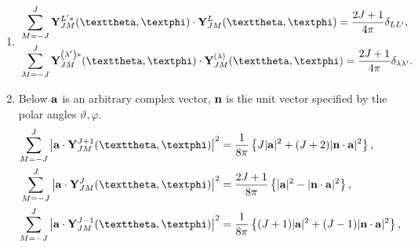 \begin{enumerate}[label=(\alph*)]
\begin{equation}
\end{equation}
In more detailed form \eqref{eq:7:3:78} reads
\begin{align}
& \sum_{M=-J}^{J} Y_{J M}^{*}(\vartheta, \varphi) \vect{Y}_{J M}^{J+1}(\vartheta, \varphi)=-\frac{\sqrt{(J+1)(2 J+1)}}{4 \pi} \vect{n}, \notag\\
& \sum_{M=-J}^{J} Y_{J M}^{*}(\vartheta, \varphi) \vect{Y}_{J M}^{J}(\vartheta, \varphi)=0, \label{eq:7:3:79}\\
& \sum_{M=-J}^{J} Y_{J M}^{*}(\vartheta, \varphi) \vect{Y}_{J M}^{J-1}(\vartheta, \varphi)=\frac{\sqrt{J(2 J+1)}}{4 \pi} \vect{n}. \notag
\end{align}
Analogous relations for $\vect{Y}_{J M}^{(\lambda)}(\vartheta, \varphi)$ have the form
\begin{gather}
\sum_{M=-J}^{J} Y_{J M}^{*}(\vartheta, \varphi) \vect{Y}_{J M}^{(1)}(\vartheta, \varphi)=\sum_{M=-J}^{J} Y_{J M}^{*}(\vartheta, \varphi) \vect{Y}_{J M}^{(0)}(\vartheta, \varphi)=0, \label{eq:7:3:80}\\
\sum_{M=-J}^{J} Y_{J M}^{*}(\vartheta, \varphi) \vect{Y}_{J M}^{(-1)}(\vartheta, \varphi)=\frac{2 J+1}{4 \pi} \vect{n}. \notag
\end{gather}
\item
\begin{align}
& \sum_{M=-J}^{J} \vect{Y}_{J M}^{L^{\prime} *}(\vartheta, \varphi) \cdot \vect{Y}_{J M}^{L}(\vartheta, \varphi)=\frac{2 J+1}{4 \pi} \delta_{L L^{\prime}}, \label{eq:7:3:81}\\
& \sum_{M=-J}^{J} \vect{Y}_{J M}^{\left(\lambda^{\prime}\right) *}(\vartheta, \varphi) \cdot \vect{Y}_{J M}^{(\lambda)}(\vartheta, \varphi)=\frac{2 J+1}{4 \pi} \delta_{\lambda \lambda^{\prime}}. \notag
\end{align}
\item Below $\mathbf{a}$ is an arbitrary complex vector, $\mathbf{n}$ is the unit vector specified by the polar angles $\vartheta, \varphi$.
\begin{align}
\sum_{M=-J}^{J}\left|\vect{a} \cdot \vect{Y}_{J M}^{J+1}(\vartheta, \varphi)\right|^{2}&=\frac{1}{8 \pi}\left\{J|\vect{a}|^{2}+(J+2)|\vect{n} \cdot \vect{a}|^{2}\right\}, \label{eq:7:3:82}\\
\sum_{M=-J}^{J}\left|\vect{a} \cdot \vect{Y}_{J M}^{J}(\vartheta, \varphi)\right|^{2}&=\frac{2 J+1}{8 \pi}\left\{|\vect{a}|^{2}-|\vect{n} \cdot \vect{a}|^{2}\right\}, \label{eq:7:3:83}\\
\sum_{M=-J}^{J}\left|\vect{a} \cdot \vect{Y}_{J M}^{J-1}(\vartheta, \varphi)\right|^{2}&=\frac{1}{8 \pi}\left\{(J+1)|\vect{a}|^{2}+(J-1)|\vect{n} \cdot \vect{a}|^{2}\right\}, \label{eq:7:3:84}\\

\end{align}
\end{enumerate}
